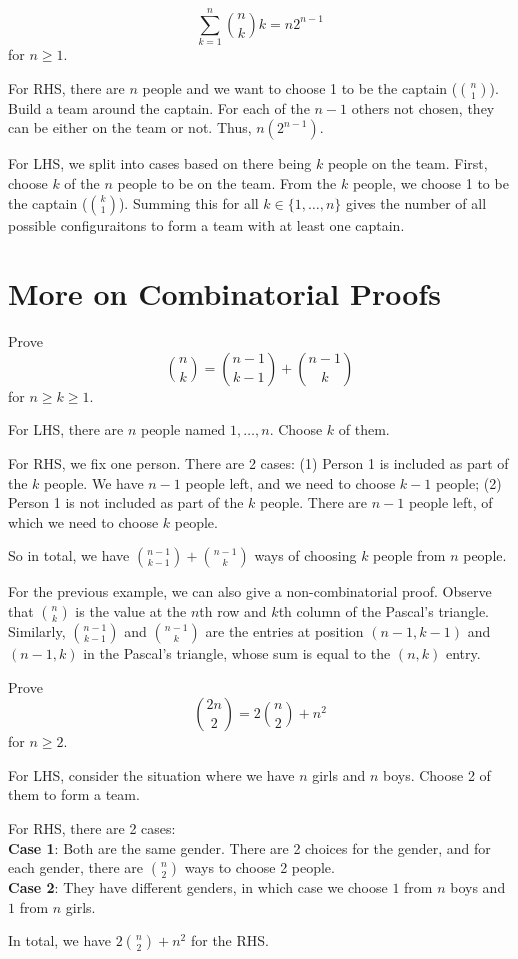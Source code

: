 \begin{example}
    $$
    \sum_{k=1}^n \binom{n}{k} k = n 2^{n-1}
    $$
    for $n \geq 1$.

    For RHS, there are $n$ people and we want to choose 1 to be the captain ($\binom{n}{1}$). Build a team around the captain. For each of the $n-1$ others not chosen, they can be either on the team or not. Thus, $n (2^{n-1})$.

    For LHS, we split into cases based on there being $k$ people on the team. First, choose $k$ of the $n$ people to be on the team. From the $k$ people, we choose 1 to be the captain ($\binom{k}{1}$). Summing this for all $k \in \{1,\ldots,n\}$ gives the number of all possible configuraitons to form a team with at least one captain.
\end{example}

\section{More on Combinatorial Proofs}

\begin{example}
    Prove
    $$
    \binom{n}{k} = \binom{n - 1}{k - 1} + \binom{n - 1}{k}
    $$
    for $n \geq k \geq 1$.

    For LHS, there are $n$ people named $1, \ldots, n$. Choose $k$ of them.

    For RHS, we fix one person. There are 2 cases: (1) Person 1 is included as part of the $k$ people. We have $n-1$ people left, and we need to choose $k-1$ people; (2) Person 1 is not included as part of the $k$ people. There are $n-1$ people left, of which we need to choose $k$ people.

    So in total, we have $\binom{n-1}{k-1} + \binom{n-1}{k}$ ways of choosing $k$ people from $n$ people.
\end{example}

For the previous example, we can also give a non-combinatorial proof. Observe that $\binom{n}{k}$ is the value at the $n$th row and $k$th column of the Pascal's triangle. Similarly, $\binom{n-1}{k-1}$ and $\binom{n-1}{k}$ are the entries at position $(n-1,k-1)$ and $(n-1,k)$ in the Pascal's triangle, whose sum is equal to the $(n,k)$ entry.

\begin{example}
    Prove
    $$
    \binom{2n}{2} = 2 \binom{n}{2} + n^2
    $$
    for $n \geq 2$.

    For LHS, consider the situation where we have $n$ girls and $n$ boys. Choose 2 of them to form a team.

    For RHS, there are 2 cases: \\
    \textbf{Case 1}: Both are the same gender. There are 2 choices for the gender, and for each gender, there are $\binom{n}{2}$ ways to choose 2 people. \\
    \textbf{Case 2}: They have different genders, in which case we choose $1$ from $n$ boys and $1$ from $n$ girls.

    In total, we have $2 \binom{n}{2} + n^2$ for the RHS.
\end{example}

